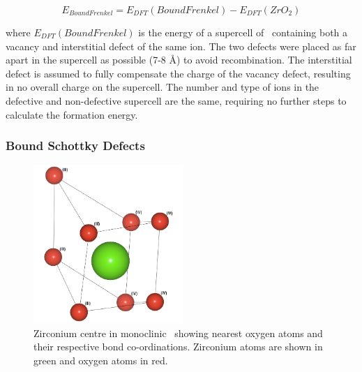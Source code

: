\begin{equation}
\label{equation_frenkel_bound}
E_{BoundFrenkel} = E_{DFT}(BoundFrenkel) - E_{DFT}(ZrO_2)%
\end{equation}

where $E_{DFT}(BoundFrenkel)$ is the energy of a supercell of \zirconia\ containing both a vacancy and interstitial defect of the same ion. The two defects were placed as far apart in the supercell as possible (7-8 \r{A}) to avoid recombination. The interstitial defect is assumed to fully compensate the charge of the vacancy defect, resulting in no overall charge on the supercell. The number and type of ions in the defective and non-defective supercell are the same, requiring no further steps to calculate the formation energy.

\subsubsection*{Bound Schottky Defects}

\begin{figure}[htp] %
\centering
\includegraphics[height=6cm]{images/zr_centre_mono.png}
\caption{Zirconium centre in monoclinic \zirconia\ showing nearest oxygen atoms and their respective bond co-ordinations. Zirconium atoms are shown in green and oxygen atoms in red.}
\label{figure:monoschottky}
\end{figure}

